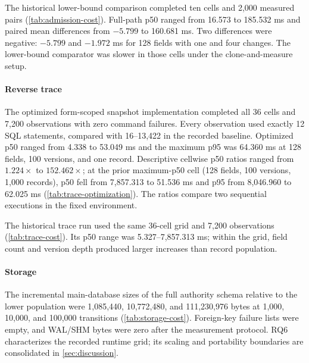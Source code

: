 

The historical lower-bound comparison completed ten cells and 2,000 measured pairs (\cref{tab:admission-cost}). Full-path p50 ranged from 16.573 to 185.532 ms and paired mean differences from $-5.799$ to 160.681 ms. Two differences were negative: $-5.799$ and $-1.972$ ms for 128 fields with one and four changes. The lower-bound comparator was slower in those cells under the clone-and-measure setup.



\paragraph{Reverse trace}
The optimized form-scoped snapshot implementation completed all 36 cells and 7,200 observations with zero command failures. Every observation used exactly 12 SQL statements, compared with 16--13,422 in the recorded baseline. Optimized p50 ranged from 4.338 to 53.049 ms and the maximum p95 was 64.360 ms at 128 fields, 100 versions, and one record. Descriptive cellwise p50 ratios ranged from $1.224\times$ to $152.462\times$; at the prior maximum-p50 cell (128 fields, 100 versions, 1,000 records), p50 fell from 7,857.313 to 51.536 ms and p95 from 8,046.960 to 62.025 ms (\cref{tab:trace-optimization}). The ratios compare two sequential executions in the fixed environment.



The historical trace run used the same 36-cell grid and 7,200 observations (\cref{tab:trace-cost}). Its p50 range was 5.327--7,857.313 ms; within the grid, field count and version depth produced larger increases than record population.

\paragraph{Storage}
The incremental main-database sizes of the full authority schema relative to the lower population were 1,085,440, 10,772,480, and 111,230,976 bytes at 1,000, 10,000, and 100,000 transitions (\cref{tab:storage-cost}). Foreign-key failure lists were empty, and WAL/SHM bytes were zero after the measurement protocol. RQ6 characterizes the recorded runtime grid; its scaling and portability boundaries are consolidated in \cref{sec:discussion}.

